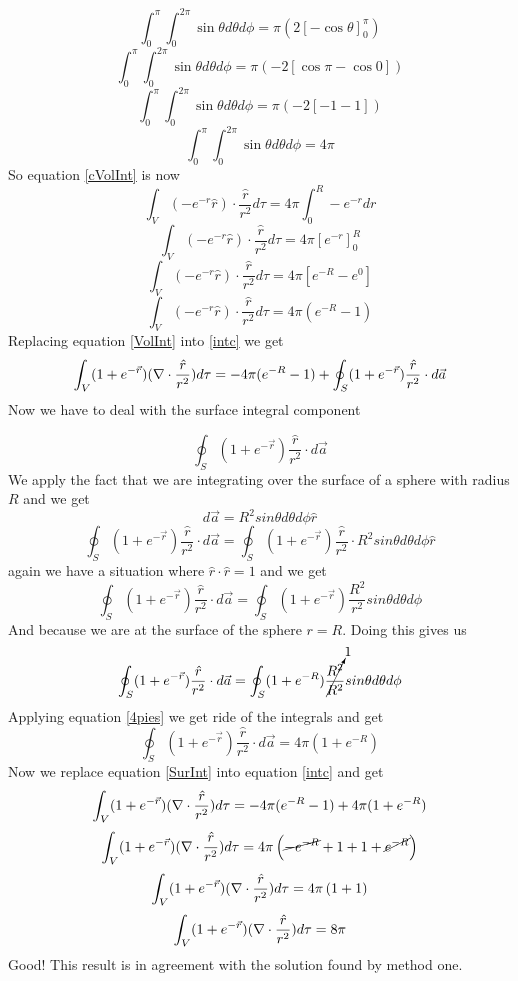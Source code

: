 \documentclass[11pt]{article}
\numberwithin{equation}{section}
\newcommand{\grad}{\bold\nabla}
\begin{document}
\begin{enumerate}[(a)]
$$\int_{0}^{\pi}\int_{0}^{2\pi}\sin{\theta}d\theta d\phi = \pi (2\left[-\cos{\theta}\right]_{0}^{\pi})$$
$$\int_{0}^{\pi}\int_{0}^{2\pi}\sin{\theta}d\theta d\phi = \pi (-2[\cos{\pi} - \cos{0}])$$
$$\int_{0}^{\pi}\int_{0}^{2\pi}\sin{\theta}d\theta d\phi = \pi (-2[-1 - 1])$$
\begin{equation}
\int_{0}^{\pi}\int_{0}^{2\pi}\sin{\theta}d\theta d\phi = 4\pi
\label{4pies}
\end{equation}
So equation \ref{cVolInt} is now
$$\int_V (-e^{-r} \hat{r})\cdot \frac{\hat{r}}{r^2} d\tau = 4\pi\int_{0}^{R} -e^{-r} dr$$
$$\int_V (-e^{-r} \hat{r})\cdot \frac{\hat{r}}{r^2} d\tau = 4\pi [e^{-r}]_0^R$$
$$\int_V (-e^{-r} \hat{r})\cdot \frac{\hat{r}}{r^2} d\tau = 4\pi [e^{-R} - e^{0}]$$
\begin{equation}
\int_V (-e^{-r} \hat{r})\cdot \frac{\hat{r}}{r^2} d\tau = 4\pi (e^{-R} - 1)
\label{VolInt}
\end{equation}
Replacing equation \ref{VolInt} into \ref{intc} we get
$$\int_V (1 + e^{-\vec{r}})(\grad \cdot \frac{\hat{r}}{r^2}) d\tau = -4\pi(e^{-R} - 1)  + \oint_S(1 + e^{-\vec{r}})\frac{\hat{r}}{r^2} \cdot d\vec{a}$$
Now we have to deal with the surface integral component

$$\oint_S(1 + e^{-\vec{r}})\frac{\hat{r}}{r^2} \cdot d\vec{a}$$
We apply the fact that we are integrating over the surface of a sphere with radius $R$ and we get 
$$d\vec{a} = R^2sin{\theta}d\theta d\phi \hat{r}$$
$$\oint_S(1 + e^{-\vec{r}})\frac{\hat{r}}{r^2} \cdot d\vec{a} = \oint_S(1 + e^{-\vec{r}})\frac{\hat{r}}{r^2} \cdot R^2sin{\theta}d\theta d\phi \hat{r}$$
again we have a situation where $\hat{r} \cdot \hat{r} = 1$ and we get
$$\oint_S(1 + e^{-\vec{r}})\frac{\hat{r}}{r^2} \cdot d\vec{a} = \oint_S(1 + e^{-\vec{r}})\frac{R^2}{r^2} sin{\theta}d\theta d\phi$$
And because we are at the surface of the sphere $r=R$. Doing this gives us
$$\oint_S(1 + e^{-\vec{r}})\frac{\hat{r}}{r^2} \cdot d\vec{a} = \oint_S(1 + e^{-R})\cancelto{1}{\frac{R^2}{R^2}} sin{\theta}d\theta d\phi$$
Applying equation \ref{4pies} we get ride of the integrals and get
\begin{equation}
\oint_S(1 + e^{-\vec{r}})\frac{\hat{r}}{r^2} \cdot d\vec{a} = 4\pi(1 + e^{-R})
\label{SurInt}
\end{equation}
Now we replace equation \ref{SurInt} into equation \ref{intc} and get
$$\int_V (1 + e^{-\vec{r}})(\grad \cdot \frac{\hat{r}}{r^2}) d\tau = -4\pi(e^{-R} - 1)  + 4\pi(1 + e^{-R})$$
$$\int_V (1 + e^{-\vec{r}})(\grad \cdot \frac{\hat{r}}{r^2}) d\tau = 4\pi\left(\cancel{-e^{-R}} + 1  + 1 + \cancel{e^{-R}}\right)$$
$$\int_V (1 + e^{-\vec{r}})(\grad \cdot \frac{\hat{r}}{r^2}) d\tau = 4\pi\left( 1 + 1\right)$$
$$\int_V (1 + e^{-\vec{r}})(\grad \cdot \frac{\hat{r}}{r^2}) d\tau = 8\pi$$
Good! This result is in agreement with the solution found by method one.
\begin{center}
\fbox{$8\pi$}
\end{center}
\end{enumerate}
\end{document}
